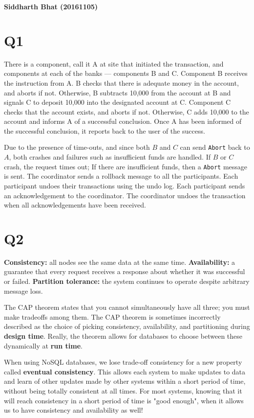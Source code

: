 \documentclass{article}
\begin{document}
\textbf{Siddharth Bhat (20161105)}

\section{Q1}
There is a component, call it A at site that initiated the transaction, and
components at each of the banks --- components B and C. Component B receives
the instruction from A. B checks that there is adequate money in the account, and
aborts if not.  Otherwise, B subtracts 10,000 from the account at B and
signals C to deposit 10,000 into the designated account at C. Component C
checks that the account exists, and aborts if not. Otherwise, C adds 10,000 to
the account and informs A of a successful conclusion. Once A has been
informed of the successful conclusion, it reports back to the user of
the success.

Due to the presence of time-outs, and since both $B$ and $C$ can send \texttt{Abort}
back to $A$, both crashes and failures such as insufficient funds are handled.
If $B$ or $C$ crash, the request times out; If there are insufficient funds,
then a \texttt{Abort} message is sent.
The coordinator sends a rollback message to all the participants.  Each
participant undoes their transactions using the undo log. Each participant sends an
acknowledgement to the coordinator.  The coordinator undoes the transaction
when all acknowledgements have been received.




\section{Q2}
\textbf{Consistency:} all nodes see the same data at the same time.
\textbf{Availability:} a guarantee that every request receives a response about whether it was successful or failed.
\textbf{Partition tolerance:} the system continues to operate despite arbitrary message loss.

The CAP theorem states that you cannot simultaneously have all three; you must make
tradeoffs among them. The CAP theorem is sometimes incorrectly described  as
the choice of picking consistency, availability, and partitioning during
\textbf{design time}. Really, the theorem allows for databases to choose
between these dynamically at \textbf{run time}.

When using NoSQL databases, we lose trade-off consistency for
a new property called \textbf{eventual consistency}.
This allows each system to make updates to data and learn of other updates
made by other systems within a short period of time, without being totally
consistent at all times. For most systems, knowing that it will reach
consistency in a short period of time is "good enough", when it allows
us to have consistency and availability as well!
\end{document}
